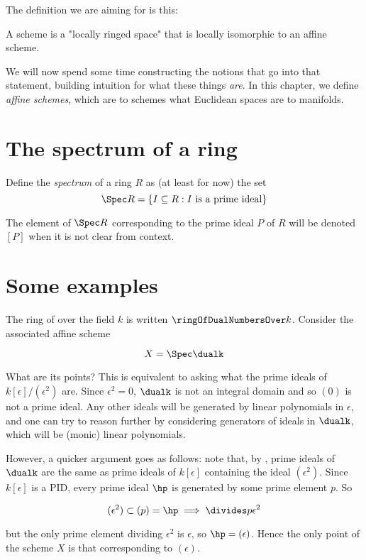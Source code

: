 \medskip\noindent The definition we are aiming for is this:

\begin{adefinition}[Target]
  A scheme is a "locally ringed space" that is locally isomorphic to an affine
  scheme.
\end{adefinition}

We will now spend some time constructing the notions that go into that
statement, building intuition for what these things \emph{are}. In this chapter,
we define \emph{affine schemes}, which are to schemes what Euclidean spaces are
to manifolds.

\section{The spectrum of a ring}%
\label{sec:the-spectrum-of-a-ring}

\begin{adefinition}[Provisional]
 Define the \emph{spectrum} of a ring $R$ as (at least for now) the set
\[ \Spec R = \{ I \subseteq R : I \text{ is a prime ideal} \} \]
\end{adefinition}

The element of $\Spec R$ corresponding to the prime ideal $P$ of $R$ will be
denoted $[P]$ when it is not clear from context.

\section{Some examples}
\label{sec:examples-of-affine-schemes}

\begin{example}
  The ring of  over the field $k$ is written
  $\ringOfDualNumbersOver k$. Consider the associated affine scheme

  \[ X = \Spec \dualk \]

  \medskip\noindent What are its points? This is equivalent to asking what the
  prime ideals of $k[\epsilon]/(\epsilon^2)$ are. Since $\epsilon^2 = 0$, $\dualk$ is not an integral domain
  and so $(0)$ is not a prime ideal. Any other ideals will be generated by
  linear polynomials in $\epsilon$, and one can try to reason further by
  considering generators of ideals in $\dualk$, which will be (monic) linear
  polynomials.

  \medskip\noindent However, a quicker argument goes as follows: note that, by
  , prime ideals of $\dualk$
  are the same as prime ideals of $k[\epsilon]$ containing the ideal
  $(\epsilon^2)$. Since $k[\epsilon]$ is a PID, every prime ideal $\hp$ is
  generated by some prime element $p$. So

  \[ (\epsilon^2) \subset (p) = \hp \implies \divides p {\epsilon^2} \]

  \medskip\noindent
  but the only prime element dividing $\epsilon^2$ is
  $\epsilon$, so $\hp = (\epsilon)$. Hence the only point of the scheme $X$ is
  that corresponding to $(\epsilon)$.

\end{example}
